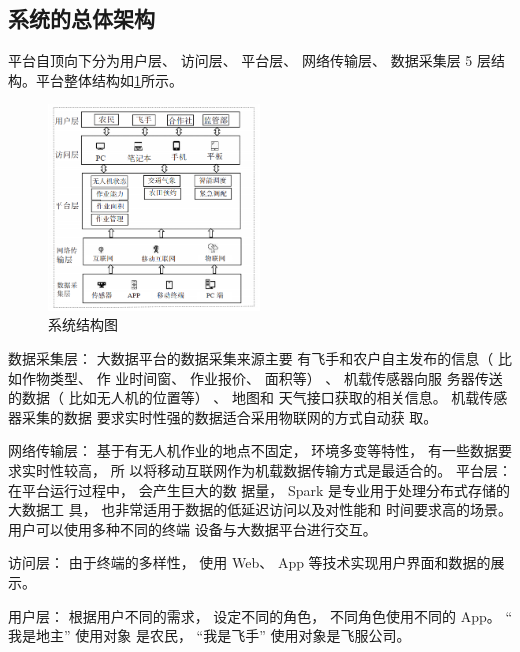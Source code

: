 \documentclass[UTF8,a4paper,10pt,nocolorlinks]{ctexart}
\begin{document}
    \subsection{系统的总体架构}
    平台自顶向下分为用户层、 访问层、 平台层、
网络传输层、 数据采集层 5 层结构。平台整体结构如\ref{struct}所示。
    \begin{figure}[h]
            \centering %
            \includegraphics[width=0.5\textwidth]{struct.png} %
            \caption{系统结构图}
            \label{struct}
    \end{figure}
    \par 数据采集层： 大数据平台的数据采集来源主要
有飞手和农户自主发布的信息（ 比如作物类型、 作
业时间窗、 作业报价、 面积等） 、 机载传感器向服
务器传送的数据（ 比如无人机的位置等） 、 地图和
天气接口获取的相关信息。 机载传感器采集的数据
要求实时性强的数据适合采用物联网的方式自动获
取。\par
网络传输层： 基于有无人机作业的地点不固定，
环境多变等特性， 有一些数据要求实时性较高， 所
以将移动互联网作为机载数据传输方式是最适合的。
平台层： 在平台运行过程中， 会产生巨大的数
据量， Spark 是专业用于处理分布式存储的大数据工
具， 也非常适用于数据的低延迟访问以及对性能和
时间要求高的场景。 用户可以使用多种不同的终端
设备与大数据平台进行交互。\par
访问层： 由于终端的多样性， 使用 Web、 App
等技术实现用户界面和数据的展示。\par
用户层： 根据用户不同的需求， 设定不同的角色，
不同角色使用不同的 App。 “ 我是地主” 使用对象
是农民， “我是飞手” 使用对象是飞服公司。
\end{document}

